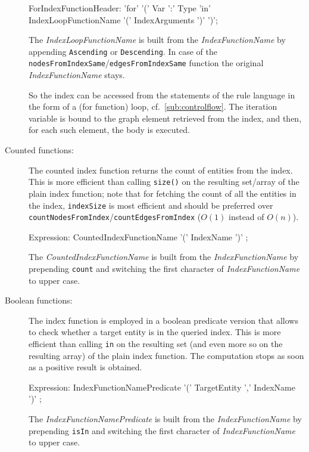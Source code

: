 \begin{description}
\begin{rail}
  ForIndexFunctionHeader: 'for' '(' Var ':' Type 'in' \\ IndexLoopFunctionName '(' IndexArguments ')' ')';
\end{rail}

The \emph{IndexLoopFunctionName} is built from the \emph{IndexFunctionName} by appending \texttt{Ascending} or \texttt{Descending}.
In case of the \texttt{nodesFromIndexSame}/\texttt{edgesFromIndexSame} function the original \emph{IndexFunctionName} stays.

So the index can be accessed from the statements of the rule language in the form of a (for function) loop, cf.~\ref{sub:controlflow}.
The iteration variable is bound to the graph element retrieved from the index, and then, for each such element, the body is executed.

	\item[Counted functions:] The counted index function returns the count of entities from the index. This is more efficient than calling \texttt{size()} on the resulting set/array of the plain index function; note that for fetching the count of all the entities in the index, \texttt{indexSize} is most efficient and should be preferred over \texttt{countNodesFromIndex}/\texttt{countEdgesFromIndex} ($O(1)$ instead of $O(n)$).
\begin{rail}
Expression:
  CountedIndexFunctionName '(' IndexName ')' ;
\end{rail}
The \emph{CountedIndexFunctionName} is built from the \emph{IndexFunctionName} by prepending \texttt{count} and switching the first character of \emph{IndexFunctionName} to upper case.

	\item[Boolean functions:] The index function is employed in a boolean predicate version that allows to check whether a target entity is in the queried index. This is more efficient than calling \texttt{in} on the resulting set (and even more so on the resulting array) of the plain index function. The computation stops as soon as a positive result is obtained.
\begin{rail}
Expression:
  IndexFunctionNamePredicate '(' TargetEntity ',' IndexName ')' ;
\end{rail}
The \emph{IndexFunctionNamePredicate} is built from the \emph{IndexFunctionName} by prepending \texttt{isIn} and switching the first character of \emph{IndexFunctionName} to upper case.
\end{description}

